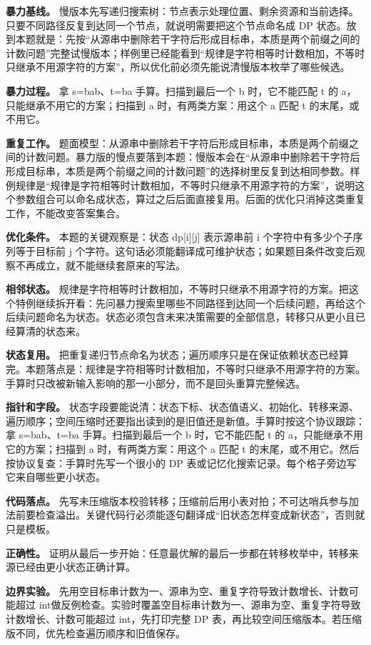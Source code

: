 \textbf{暴力基线。} 慢版本先写递归搜索树：节点表示处理位置、剩余资源和当前选择。只要不同路径反复到达同一个节点，就说明需要把这个节点命名成 DP 状态。放到本题就是：先按“从源串中删除若干字符后形成目标串，本质是两个前缀之间的计数问题”完整试慢版本；样例里已经能看到“规律是字符相等时计数相加，不等时只继承不用源字符的方案”，所以优化前必须先能说清慢版本枚举了哪些候选。

\textbf{暴力过程。} 拿 s=bab、t=ba 手算。扫描到最后一个 b 时，它不能匹配 t 的 a，只能继承不用它的方案；扫描到 a 时，有两类方案：用这个 a 匹配 t 的末尾，或不用它。

\textbf{重复工作。} 题面模型：从源串中删除若干字符后形成目标串，本质是两个前缀之间的计数问题。暴力版的慢点要落到本题：慢版本会在“从源串中删除若干字符后形成目标串，本质是两个前缀之间的计数问题”的选择树里反复到达相同参数。样例规律是“规律是字符相等时计数相加，不等时只继承不用源字符的方案”，说明这个参数组合可以命名成状态，算过之后后面直接复用。后面的优化只消掉这类重复工作，不能改变答案集合。

\textbf{优化条件。} 本题的关键观察是：状态 dp[i][j] 表示源串前 i 个字符中有多少个子序列等于目标前 j 个字符。这句话必须能翻译成可维护状态；如果题目条件改变后观察不再成立，就不能继续套原来的写法。

\textbf{相邻状态。} 规律是字符相等时计数相加，不等时只继承不用源字符的方案。把这个特例继续拆开看：先问暴力搜索里哪些不同路径到达同一个后续问题，再给这个后续问题命名为状态。状态必须包含未来决策需要的全部信息，转移只从更小且已经算清的状态来。

\textbf{状态复用。} 把重复递归节点命名为状态；遍历顺序只是在保证依赖状态已经算完。本题落点是：规律是字符相等时计数相加，不等时只继承不用源字符的方案。手算时只改被新输入影响的那一小部分，而不是回头重算完整候选。

\textbf{指针和字段。} 状态字段要能说清：状态下标、状态值语义、初始化、转移来源、遍历顺序；空间压缩时还要指出读到的是旧值还是新值。手算时按这个协议跟踪：拿 s=bab、t=ba 手算。扫描到最后一个 b 时，它不能匹配 t 的 a，只能继承不用它的方案；扫描到 a 时，有两类方案：用这个 a 匹配 t 的末尾，或不用它。然后按协议复查：手算时先写一个很小的 DP 表或记忆化搜索记录。每个格子旁边写它来自哪些更小状态。

\textbf{代码落点。} 先写未压缩版本校验转移；压缩前后用小表对拍；不可达哨兵参与加法前要检查溢出。关键代码行必须能逐句翻译成“旧状态怎样变成新状态”，否则就只是模板。

\textbf{正确性。} 证明从最后一步开始：任意最优解的最后一步都在转移枚举中，转移来源已经由更小状态正确计算。

\textbf{边界实验。} 先用空目标串计数为一、源串为空、重复字符导致计数增长、计数可能超过 int做反例检查。实验时覆盖空目标串计数为一、源串为空、重复字符导致计数增长、计数可能超过 int，先打印完整 DP 表，再比较空间压缩版本。若压缩版不同，优先检查遍历顺序和旧值保存。

